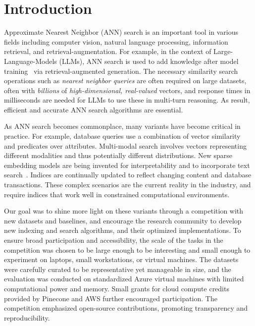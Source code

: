 
\section{Introduction}
\label{sec:intro}


Approximate Nearest Neighbor (ANN) search is an important tool in various fields including computer vision, 
natural language processing, information retrieval, and retrieval-augmentation.
For example, in the context of Large-Language-Models (LLMs), ANN search is used to add knowledge after model training~\cite{DBLP:conf/iclr/KhandelwalLJZL20} via retrieval-augmented generation.
The necessary similarity search operations such as \emph{nearest neighbor queries}
are often required on large datasets, often with  \emph{billions} of \emph{high-dimensional, real-valued} vectors,
and response times in milliseconds are needed for LLMs to use these in multi-turn reasoning.
As result, efficient and accurate ANN search algorithms are essential.

As ANN search becomes commonplace, many variants have become critical  in practice.
For example, database
queries use a combination of vector similarity and predicates over attributes. Multi-modal
search involves vectors representing different modalities and thus potentially different distributions.
New sparse embedding models are being invented for interpretability and to incorporate text search~\cite{formal2022splade}.
Indices are continually updated to reflect changing content and database transactions.
These complex scenarios are the current reality in the industry, and require
indices that work well in constrained  computational environments.



Our goal was to shine more light on these variants through a competition with new datasets and baselines,
and encourage the research community to develop  new indexing and search algorithms, and their optimized implementations.
To ensure broad participation and accessibility, the scale of the tasks in the competition was chosen
to be large enough to be interesting and small enough to experiment on laptops, small workstations, or virtual machines.
The datasets were carefully curated to be representative yet manageable in size, and the evaluation was
conducted on standardized Azure virtual machines with limited computational power and memory.
Small grants for cloud compute credits provided by Pinecone and AWS further encouraged participation.
The competition emphasized open-source contributions, promoting transparency and reproducibility.

